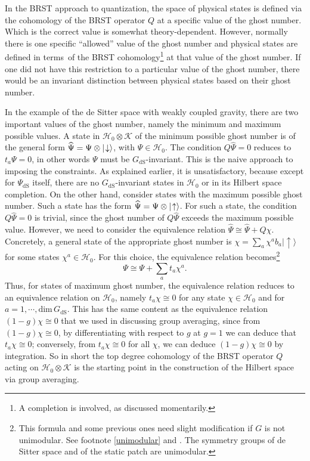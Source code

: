\documentclass[11pt,a4paper]{article}
\def\dim{{\mathrm{dim}}}
\def\be{\begin{equation}}
\def\ee{\end{equation}}
\def\h{\widehat}
\def\K{{\mathcal K}}
\def\h{\widehat}
\def\H{{\mathcal H}}
\def\dS{{\mathrm{dS}}}
\def\ra{\rangle}
\begin{document}
In the BRST approach to quantization, the space of physical states is defined via the cohomology of the BRST operator $Q$ at a specific value of the ghost number.
Which is the correct value is somewhat theory-dependent.   However, normally there is one specific ``allowed'' value of the ghost number and physical states
are defined in terms\ of the BRST cohomology\footnote{A completion is involved, as discussed momentarily.} at that value of the ghost number.    If one did not
have this restriction to a particular value of the ghost number, there would be an invariant distinction between physical states based on their ghost number.

In the example of the de Sitter space with weakly coupled gravity, there are two important values of the ghost number, namely the minimum and maximum possible
values.   A state in $\H_0\otimes \K$ of the minimum possible ghost number is of the general form $\h\Psi=\Psi \otimes |\negthinspace\downarrow\ra$, with $\Psi\in\H_0$.
The condition $Q\h\Psi=0$ reduces to $t_a\Psi=0$, in other words $\Psi$ must be $G_\dS$-invariant.   This is the naive approach to imposing the constraints.
As explained earlier, it is unsatisfactory, because except for $\Psi_\dS$ itself, there are no $G_\dS$-invariant states in $\H_0$ or in its Hilbert space completion.
On the other hand, consider states with the maximum possible ghost number.   Such a state has the form $\h\Psi=\Psi\otimes |\negthinspace\uparrow\ra$.
For such a state, the condition $Q\h\Psi =0$ is trivial, since the ghost number of $Q\h\Psi$ exceeds the maximum possible value.   However,
we need to consider the equivalence relation $\h\Psi\cong \h\Psi+Q\chi$.    Concretely, a general state of the appropriate ghost number is
 $\chi=\sum_a \chi^a b_a|\uparrow\ra$ for some states
$\chi^a\in\H_0$. For this choice, the equivalence relation becomes\footnote{This formula and some previous ones need slight modification if $G$ is not unimodular.  
See footnote \ref{unimodular} and \cite{MarolfReview}.  The symmetry groups of de Sitter space and of the static patch are unimodular.}
\be\label{eqrel} \Psi\cong \Psi+\sum_a t_a\chi^a. \ee
Thus, for states of maximum ghost number, the equivalence relation reduces to an equivalence relation on $\H_0$, namely
 $t_a\chi\cong 0$ for any state $\chi\in\H_0$ and for $a=1,\cdots,\dim\,G_\dS$.  This
 has the same content as the equivalence relation $(1-g)\chi\cong 0$ that we used in discussing group averaging, since
from $(1-g)\chi\cong 0$, by differentiating with respect to $g$ at $g=1$ we can deduce that $t_a\chi\cong 0$;
conversely, from $t_a\chi\cong 0$ for all $\chi$, we can deduce $(1-g)\chi\cong 0$ by integration.   
So in short the top degree cohomology of the BRST operator $Q$ acting on $\H_0\otimes \K$ is the starting point in the construction of the Hilbert space via group
averaging.  
\end{document}
